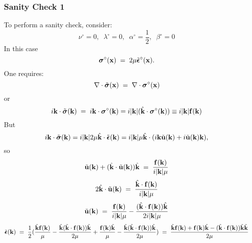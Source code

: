 \documentclass[12pt]{article}
\def\bmath#1{\mbox{\boldmath$#1$}}
\begin{document}
\subsubsection{Sanity Check 1}

To perform a sanity check, consider:
\begin{equation}
 \nu^\circ = 0, \;\; \lambda^\circ = 0, \;\; \alpha^\circ = \frac{1}{2}, \;\; \beta^\circ = 0
\end{equation}
In this case
\begin{equation}
 \bmath{\sigma}^\circ({\bf x}) \;=\; 2\mu \tilde{\bmath{\epsilon}}^\circ({\bf x}).
\end{equation}
One requires:
\begin{equation}
 \nabla\cdot \tilde{\bmath{\sigma}}({\bf x}) \;=\; 
 \nabla\cdot \bmath{\sigma}^\circ({\bf x})
\end{equation}
or
\begin{equation}
 i{\bf k}\cdot \tilde{\bmath{\sigma}}({\bf k}) \;=\; 
 i{\bf k}\cdot \bmath{\sigma}^\circ({\bf k}) = 
i|{\bf k}| (\hat{\bf k}\cdot \bmath{\sigma}^\circ({\bf k})) \equiv i|{\bf k}| {\bf f}({\bf k})
\end{equation}
But 
\begin{equation}
 i{\bf k}\cdot \tilde{\bmath{\sigma}}({\bf k}) = i|{\bf k}| 2\mu \hat{\bf k}\cdot \tilde{\bmath{\epsilon}}({\bf k}) 
= i|{\bf k}|\mu\hat{\bf k}\cdot (i{\bf k}\tilde{\bf u}({\bf k})+ i\tilde{\bf u}({\bf k}){\bf k}),
\end{equation}
so 
\begin{equation}
 \tilde{\bf u}({\bf k}) + (\hat{\bf k}\cdot\tilde{\bf u}({\bf k}))\hat{\bf k} 
 \;=\; \frac{{\bf f}({\bf k})}{i|{\bf k}|\mu}
\end{equation}
\begin{equation}
 2\hat{\bf k}\cdot\tilde{\bf u}({\bf k})
 \;=\; \frac{\hat{\bf k}\cdot{\bf f}({\bf k})}{i|{\bf k}|\mu}
\end{equation}
\begin{equation}
 \tilde{\bf u}({\bf k}) 
 \;=\; \frac{{\bf f}({\bf k})}{i|{\bf k}|\mu} - 
  \frac{(\hat{\bf k}\cdot{\bf f}({\bf k}))\hat{\bf k}}{2i|{\bf k}|\mu}
\end{equation}
\begin{equation}
 \tilde{\bmath{\epsilon}}({\bf k}) 
 \;=\; \frac{1}{2}( 
\frac{\hat{\bf k}{\bf f}({\bf k})}{\mu} - 
  \frac{\hat{\bf k}(\hat{\bf k}\cdot{\bf f}({\bf k}))\hat{\bf k}}{2\mu}
+ \frac{{\bf f}({\bf k})\hat{\bf k}}{\mu} - 
  \frac{\hat{\bf k}(\hat{\bf k}\cdot{\bf f}({\bf k}))\hat{\bf k}}{2\mu}
) \;=\; \frac{\hat{\bf k}{\bf f}({\bf k}) + {\bf f}({\bf k})\hat{\bf k}
- (\hat{\bf k}\cdot{\bf f}({\bf k}))\hat{\bf k}\hat{\bf k}}{2\mu}
\end{equation}
\end{document}
